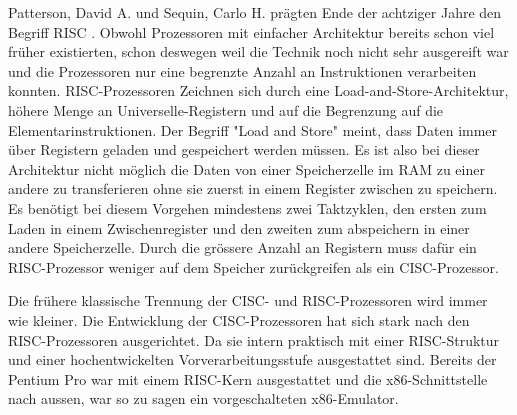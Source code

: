 Patterson, David A. und Sequin, Carlo H. prägten Ende der achtziger Jahre den Begriff RISC \cite{Patterson:1981:RIR:800052.801895}. Obwohl Prozessoren mit einfacher Architektur bereits schon viel früher existierten, schon deswegen weil die Technik noch nicht sehr ausgereift war und die Prozessoren nur eine begrenzte Anzahl an Instruktionen verarbeiten konnten. RISC-Prozessoren Zeichnen sich durch eine Load-and-Store-Architektur, höhere Menge an Universelle-Registern und auf die Begrenzung auf die Elementarinstruktionen. Der Begriff "Load and Store" meint, dass Daten immer über Registern geladen und gespeichert werden müssen. Es ist also bei dieser Architektur nicht möglich die Daten von einer Speicherzelle im RAM zu einer andere zu transferieren ohne sie zuerst in einem Register zwischen zu speichern. Es benötigt bei diesem Vorgehen mindestens zwei Taktzyklen, den ersten zum Laden in einem Zwischenregister und den zweiten zum abspeichern in einer andere Speicherzelle. Durch die grössere Anzahl an Registern muss dafür ein RISC-Prozessor weniger auf dem Speicher zurückgreifen als ein CISC-Prozessor.
\par
Die frühere klassische Trennung der CISC- und RISC-Prozessoren wird immer wie kleiner. Die Entwicklung der CISC-Prozessoren hat sich stark nach den RISC-Prozessoren ausgerichtet. Da sie intern praktisch mit einer RISC-Struktur und einer hochentwickelten Vorverarbeitungsstufe ausgestattet sind. Bereits der Pentium Pro war mit einem RISC-Kern ausgestattet und die x86-Schnittstelle nach aussen, war so zu sagen ein vorgeschalteten x86-Emulator.











